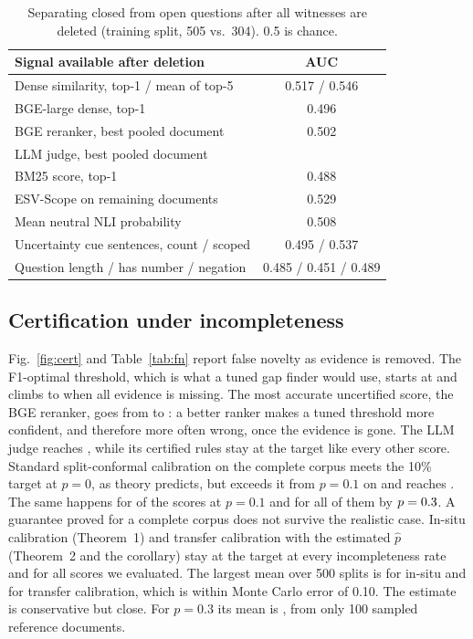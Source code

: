 \documentclass[conference,a4paper]{IEEEtran}
\theoremstyle{definition}
\begin{document}
\begin{table}[t]
\centering
\caption{Separating closed from open questions after all witnesses are deleted (training split, 505 vs.\ 304). 0.5 is chance.}
\label{tab:auc}
\begin{tabular}{lc}
\toprule
Signal available after deletion & AUC \\
\midrule
Dense similarity, top-1 / mean of top-5 & 0.517 / 0.546 \\
BGE-large dense, top-1 & 0.496 \\
BGE reranker, best pooled document & 0.502 \\
LLM judge, best pooled document & \LLMaucDel{} \\
BM25 score, top-1 & 0.488 \\
ESV-Scope on remaining documents & 0.529 \\
Mean neutral NLI probability & 0.508 \\
Uncertainty cue sentences, count / scoped & 0.495 / 0.537 \\
Question length / has number / negation & 0.485 / 0.451 / 0.489 \\
\bottomrule
\end{tabular}
\end{table}

\subsection{Certification under incompleteness}
Fig.~\ref{fig:cert} and Table~\ref{tab:fn} report false novelty as evidence is removed. The F1-optimal threshold, which is what a tuned gap finder would use, starts at \FNfoneZero{} and climbs to \FNfoneOne{} when all evidence is missing. The most accurate uncertified score, the BGE reranker, goes from \FNbgeZero{} to \FNbgeOne{}: a better ranker makes a tuned threshold more confident, and therefore more often wrong, once the evidence is gone. The LLM judge reaches \LLMfoneOne{}, while its certified rules stay at the target like every other score. Standard split-conformal calibration on the complete corpus meets the 10\% target at $p=0$, as theory predicts, but exceeds it from $p=0.1$ on and reaches \FNconfOne{}. The same happens for \NconfViolOne{} of the \Nscores{} scores at $p=0.1$ and for all of them by $p=0.3{}$. A guarantee proved for a complete corpus does not survive the realistic case. In-situ calibration (Theorem~1) and transfer calibration with the estimated $\hat p$ (Theorem~2 and the corollary) stay at the target at every incompleteness rate and for all \Nscores{} scores we evaluated. The largest mean over 500 splits is \MaxInsitu{} for in-situ and \MaxTransfer{} for transfer calibration, which is within Monte Carlo error of 0.10. The estimate is conservative but close. For $p=0.3$ its mean is \phatThree{}, from only 100 sampled reference documents.
\end{document}
